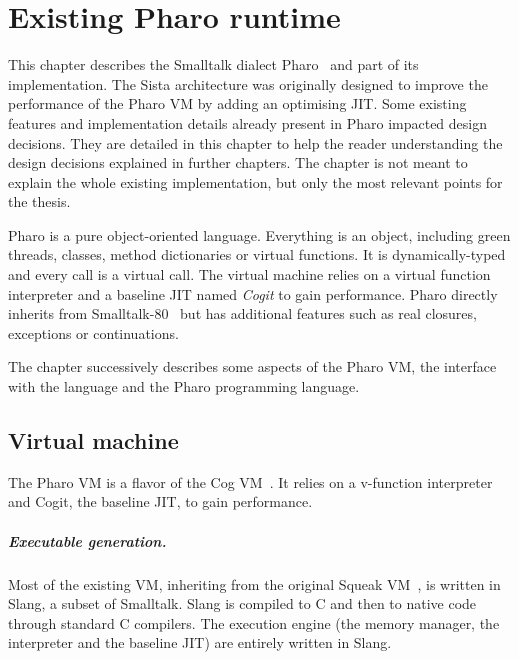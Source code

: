 \documentclass[a4paper,12pt,twoside]{../includes/ThesisStyle}
\begin{document}
\fi

\chapter{Existing Pharo runtime}
\label{chap:existing}
\minitoc

This chapter describes the Smalltalk dialect Pharo~\cite{Blac09a} and part of its implementation. The Sista architecture was originally designed to improve the performance of the Pharo VM by adding an optimising JIT. Some existing features and implementation details already present in Pharo impacted design decisions. They are detailed in this chapter to help the reader understanding the design decisions explained in further chapters. The chapter is not meant to explain the whole existing implementation, but only the most relevant points for the thesis. 

Pharo is a pure object-oriented language. Everything is an object, including green threads, classes, method dictionaries or virtual functions. It is dynamically-typed and every call is a virtual call. The virtual machine relies on a virtual function interpreter and a baseline JIT named \emph{Cogit} to gain performance. Pharo directly inherits from Smalltalk-80~\cite{Gold83a} but has additional features such as real closures, exceptions or continuations.

The chapter successively describes some aspects of the Pharo VM, the interface with the language and the Pharo programming language.


\section{Virtual machine}

The Pharo VM is a flavor of the Cog VM~\cite{Mira08a}. It relies on a v-function interpreter and Cogit, the baseline JIT, to gain performance.

\paragraph{Executable generation.}
Most of the existing VM, inheriting from the original Squeak VM~\cite{Inga97a}, is written in Slang, a subset of Smalltalk. Slang is compiled to C and then to native code through standard C compilers. The execution engine (the memory manager, the interpreter and the baseline JIT) are entirely written in Slang.
\end{document}
